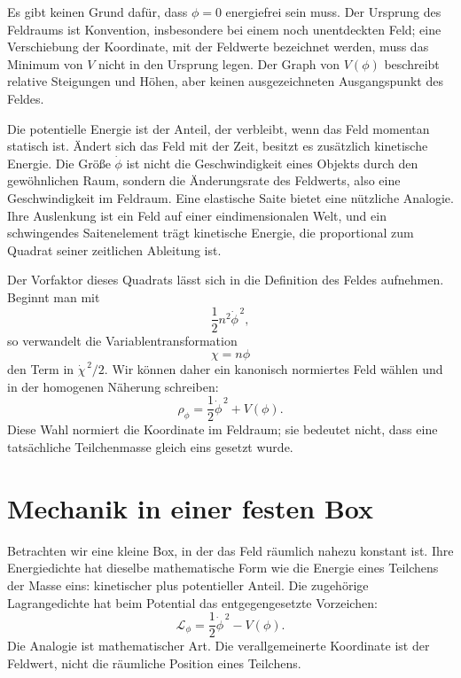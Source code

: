 Es gibt keinen Grund dafür, dass \(\phi=0\) energiefrei sein muss. Der Ursprung des Feldraums ist Konvention, insbesondere bei einem noch unentdeckten Feld; eine Verschiebung der Koordinate, mit der Feldwerte bezeichnet werden, muss das Minimum von \(V\) nicht in den Ursprung legen. Der Graph von \(V(\phi)\) beschreibt relative Steigungen und Höhen, aber keinen ausgezeichneten Ausgangspunkt des Feldes.

Die potentielle Energie ist der Anteil, der verbleibt, wenn das Feld momentan statisch ist. Ändert sich das Feld mit der Zeit, besitzt es zusätzlich kinetische Energie. Die Größe \(\dot\phi\) ist nicht die Geschwindigkeit eines Objekts durch den gewöhnlichen Raum, sondern die Änderungsrate des Feldwerts, also eine Geschwindigkeit im Feldraum. Eine elastische Saite bietet eine nützliche Analogie. Ihre Auslenkung ist ein Feld auf einer eindimensionalen Welt, und ein schwingendes Saitenelement trägt kinetische Energie, die proportional zum Quadrat seiner zeitlichen Ableitung ist.

Der Vorfaktor dieses Quadrats lässt sich in die Definition des Feldes aufnehmen. Beginnt man mit
\begin{equation}
\frac12 n^2\dot\phi^{\,2},
\end{equation}
so verwandelt die Variablentransformation
\begin{equation}
\chi=n\phi
\end{equation}
den Term in \(\dot\chi^{\,2}/2\). Wir können daher ein kanonisch normiertes Feld wählen und in der homogenen Näherung schreiben:
\begin{equation}
\rho_\phi=\frac12\dot\phi^{\,2}+V(\phi).
\label{eq:c09-rho-homogeneous}
\end{equation}
Diese Wahl normiert die Koordinate im Feldraum; sie bedeutet nicht, dass eine tatsächliche Teilchenmasse gleich eins gesetzt wurde.

\section{Mechanik in einer festen Box}

Betrachten wir eine kleine Box, in der das Feld räumlich nahezu konstant ist. Ihre Energiedichte hat dieselbe mathematische Form wie die Energie eines Teilchens der Masse eins: kinetischer plus potentieller Anteil. Die zugehörige Lagrangedichte hat beim Potential das entgegengesetzte Vorzeichen:
\begin{equation}
\mathcal L_\phi
=\frac12\dot\phi^{\,2}-V(\phi).
\label{eq:c09-lagrangian-density}
\end{equation}
Die Analogie ist mathematischer Art. Die verallgemeinerte Koordinate ist der Feldwert, nicht die räumliche Position eines Teilchens.


